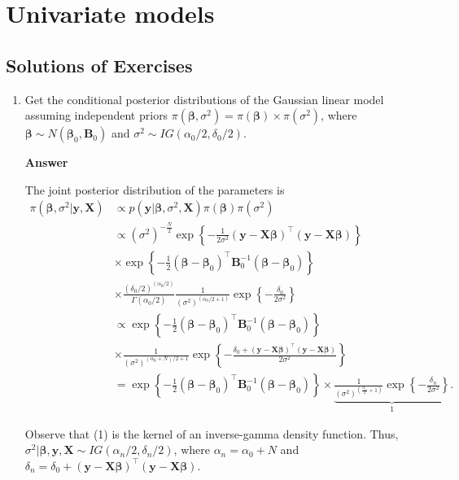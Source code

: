\chapter{Univariate models}\label{chap6}

\section*{Solutions of Exercises}\label{sec61}
\begin{enumerate}[leftmargin=*]

	\item Get the conditional posterior distributions of the Gaussian linear model assuming independent priors $\pi(\bm{\beta},\sigma^2)=\pi(\bm{\beta})\times\pi(\sigma^2)$, where $\bm{\beta} \sim N(\bm{\beta}_0, {\bm{B}}_0)$ and $\sigma^2 \sim IG(\alpha_0/2, \delta_0/2)$.
	
\textbf{Answer}
	
The joint posterior distribution of the parameters is
\begin{align*}
	\pi(\bm{\beta}, \sigma^2|\bm{y}, \bm{X}) & \propto p({\bm{y}}|\bm{\beta}, \sigma^2, \bm{X}) \pi(\bm{\beta}) \pi(\sigma^2) \\
	&\propto (\sigma^2)^{-\frac{N}{2}}\exp\left\{-\frac{1}{2\sigma^2}(\bm{y}-\bm{X}\bm{\beta})^{\top}(\bm{y}-\bm{X}\bm{\beta})\right\}\\
	&\times \exp\left\{-\frac{1}{2}(\bm{\beta} - \bm{\beta} _0)^{\top}\bm{B}_0^{-1}(\bm{\beta} - \bm{\beta}_0)\right\}\\
	&\times\frac{(\delta_0/2)^{(\alpha_0/2)}}{\Gamma(\alpha_0/2)}\frac{1}{(\sigma^2)^{(\alpha_0/2+1)}}\exp\left\{-\frac{\delta_0}{2\sigma^2}\right\}\\
	&\propto\exp\left\{-\frac{1}{2}(\bm{\beta} - \bm{\beta}_0)^{\top}\bm{B}_0^{-1}(\bm{\beta} - \bm{\beta}_0)\right\}\\
	&\times\frac{1}{(\sigma^2)^{(\alpha_0+N)/2+1}} \exp\left\{-\frac{\delta_0+(\bm{y}-\bm{X}\bm{\beta})^{\top}(\bm{y}-\bm{X}\bm{\beta})}{2\sigma^2}\right\}\\
	&=\exp\left\{-\frac{1}{2}(\bm{\beta} - \bm{\beta}_0)^{\top}\bm{B}_0^{-1}(\bm{\beta} - \bm{\beta}_0)\right\}\times\underbrace{\frac{1}{(\sigma^2)^{(\frac{\alpha_n}{2}+1)}} \exp\left\{-\frac{\delta_n}{2\sigma^2}\right\}}_1.
\end{align*}

Observe that (1) is the kernel of an inverse-gamma density function. Thus, $\sigma^2|\bm{\beta},{\bm{y}},{\bm{X}} \sim IG(\alpha_n/2,\delta_n/2)$, where $\alpha_n=\alpha_0+N$ and $\delta_n=\delta_0+(\bm{y}-\bm{X}\bm{\beta})^{\top}(\bm{y}-\bm{X}\bm{\beta})$.


\end{enumerate}
